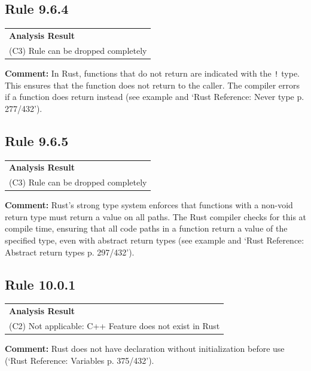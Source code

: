\subsection*{Rule 9.6.4}
\begin{longtable}{p{13cm}}
\textbf{Analysis Result} \\
(C3) Rule can be dropped completely \\
\end{longtable}
\textbf{Comment:} In Rust, functions that do not return are indicated with the \texttt{!} type. This ensures that the function does not return to the caller. The compiler errors if a function does return instead (see example and `Rust Reference: Never type p. 277/432'). \\


\subsection*{Rule 9.6.5}
\begin{longtable}{p{13cm}}
\textbf{Analysis Result} \\
(C3) Rule can be dropped completely \\
\end{longtable}
\textbf{Comment:} Rust's strong type system enforces that functions with a non-void return type must return a value on all paths. The Rust compiler checks for this at compile time, ensuring that all code paths in a function return a value of the specified type, even with abstract return types (see example and `Rust Reference: Abstract return types p. 297/432'). \\


\subsection*{Rule 10.0.1}
\begin{longtable}{p{13cm}}
\textbf{Analysis Result} \\
(C2) Not applicable: C++ Feature does not exist in Rust \\
\end{longtable}
\textbf{Comment:} Rust does not have declaration without initialization before use (`Rust Reference: Variables p. 375/432'). \\
